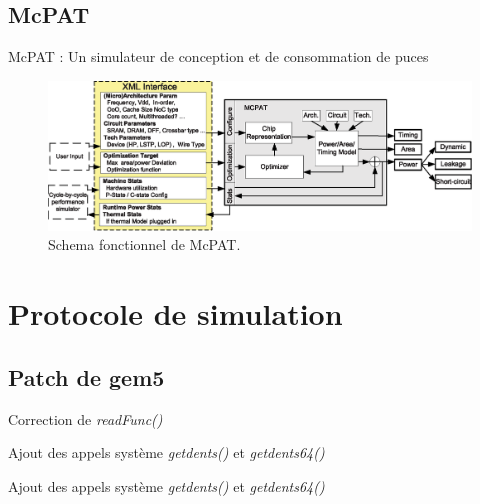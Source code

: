 \documentclass{beamer}
\begin{document}
\subsection{McPAT}
\begin{frame}{McPAT : Un simulateur de conception et de consommation de puces}
\begin{figure}[ht]
\begin{center}
\includegraphics[width=0.84\paperwidth]{McPAT_diag.eps}
\caption{\label{McPAT_schema}Schema fonctionnel de McPAT.}
\end{center}
\end{figure}
\end{frame}


\section{Protocole de simulation}
\subsection{Patch de gem5}
\begin{frame}{Correction de \textit{readFunc()}}

\end{frame}
\begin{frame}{Ajout des appels système \textit{getdents()} et \textit{getdents64()}}
\end{frame}

\begin{frame}{Ajout des appels système \textit{getdents()} et \textit{getdents64()}}
\end{frame}
\end{document}
